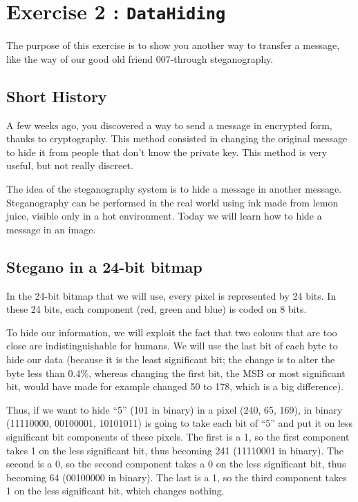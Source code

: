\documentclass[11pt, a4paper]{article}
\begin{document}
\section{Exercise 2 : \texttt{DataHiding}}\label{exercise-2-datahiding}

The purpose of this exercise is to show you another way to transfer a
message, like the way of our good old friend 007-through steganography.

\subsection{Short History}\label{short-history}

A few weeks ago, you discovered a way to send a message in encrypted
form, thanks to cryptography. This method consisted in changing the
original message to hide it from people that don't know the private key.
This method is very useful, but not really discreet.

The idea of the steganography system is to hide a message in another
message. Steganography can be performed in the real world using ink made
from lemon juice, visible only in a hot environment. Today we will learn
how to hide a message in an image.

\subsection{Stegano in a 24-bit
bitmap}\label{stegano-in-a-24-bit-bitmap}

In the 24-bit bitmap that we will use, every pixel is represented by 24
bits. In these 24 bits, each component (red, green and blue) is coded on
8 bits.

To hide our information, we will exploit the fact that two colours that
are too close are indistinguishable for humans. We will use the last bit
of each byte to hide our data (because it is the least significant bit;
the change is to alter the byte less than 0.4\%, whereas changing the
first bit, the MSB or most significant bit, would have made for example
changed 50 to 178, which is a big difference).

Thus, if we want to hide ``5'' (101 in binary) in a pixel (240, 65,
169), in binary (11110000, 00100001, 10101011) is going to take each bit
of ``5'' and put it on less significant bit components of these pixels.
The first is a 1, so the first component takes 1 on the less significant
bit, thus becoming 241 (11110001 in binary). The second is a 0, so the
second component takes a 0 on the less significant bit, thus becoming 64
(00100000 in binary). The last is a 1, so the third component takes 1 on
the less significant bit, which changes nothing.
\end{document}
